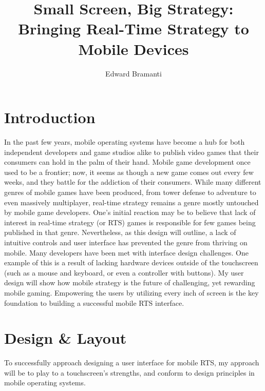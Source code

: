 \documentclass[11pt]{article}
\title{Small Screen, Big Strategy: Bringing Real-Time Strategy to Mobile Devices}
\author{Edward Bramanti}
\begin{document}
\maketitle
\pagebreak
\section{Introduction}
In the past few years, mobile operating systems have become a hub for both independent developers and game studios alike to publish video games that their consumers can hold in the palm of their hand. Mobile game development once used to be a frontier; now, it seems as though a new game comes out every few weeks, and they battle for the addiction of their consumers. While many different genres of mobile games have been produced, from tower defense to adventure to even massively multiplayer, real-time strategy remains a genre mostly untouched by mobile game developers. One's initial reaction may be to believe that lack of interest in real-time strategy (or RTS) games is responsible for few games being published in that genre. Nevertheless, as this design will outline, a lack of intuitive controls and user interface has prevented the genre from thriving on mobile. Many developers have been met with interface design challenges. One example of this is a result of lacking hardware devices outside of the touchscreen (such as a mouse and keyboard, or even a controller with buttons). My user design will show how mobile strategy is the future of challenging, yet rewarding mobile gaming. Empowering the users by utilizing every inch of screen is the key foundation to building a successful mobile RTS interface.
\section{Design \& Layout}
To successfully approach designing a user interface for mobile RTS, my approach will be to play to a touchscreen's strengths, and conform to design principles in mobile operating systems.
\end{document}
